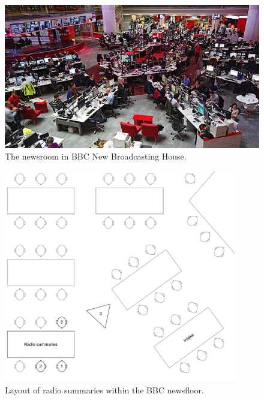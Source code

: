 \begin{figure}[p]
  \centering
  \includegraphics[width=\columnwidth]{figs/newsroom.jpg}
  \caption{The newsroom in BBC New Broadcasting House.}
  \label{fig:newsroom}
\end{figure}

\begin{figure}[p]
	\centering
	\includegraphics[width=4in]{figs/news-layout.pdf}
	\caption{Layout of radio summaries within the BBC newsfloor.}
	\label{fig:newsroom-layout}
\end{figure}

